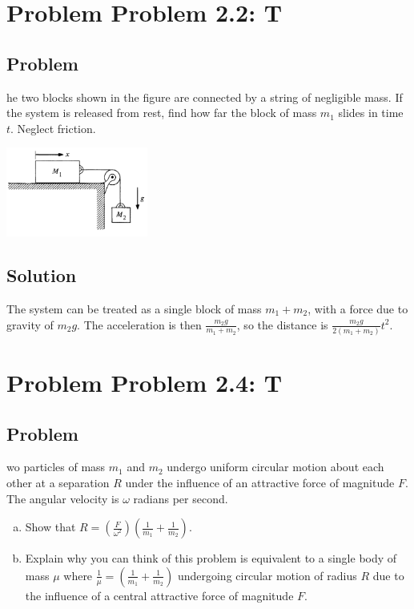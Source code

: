 \documentclass[solutions]{esg8012pset}
\date{September 17}
\begin{document}
\section*{Problem Problem 2.2: T}
\subsection*{Problem}
he two blocks shown in the figure are connected by a string of negligible mass. If the system is released from rest, find how far the block of mass $m_1$ slides in time $t$. Neglect friction.
  \begin{center}\includegraphics[width=0.35\textwidth]{ps02_1}\end{center}
\subsection*{Solution}
  The system can be treated as a single block of mass $m_1 + m_2$, with a force due to gravity of $m_2 g$.  The acceleration is then $\frac{m_2 g}{m_1 + m_2}$, so the distance is $\frac{m_2 g}{2(m_1 + m_2)} t^2$.
\section*{Problem Problem 2.4: T}
\subsection*{Problem}
wo particles of mass $m_1$ and $m_2$ undergo uniform circular motion about each other at a separation $R$ under the influence of an attractive force of magnitude $F$.  The angular velocity is $\omega$ radians per second.
  \begin{enumerate}[a)]
    \item Show that $R = \left(\frac{F}{\omega^2}\right)\left(\frac{1}{m_1} + \frac{1}{m_2}\right)$.
    \item Explain why you can think of this problem is equivalent to a single body of mass $\mu$ where $\frac{1}{\mu} = \left(\frac{1}{m_1} + \frac{1}{m_2}\right)$ undergoing circular motion of radius $R$ due to the influence of a central attractive force of magnitude $F$.
  \end{enumerate}
\end{document}

